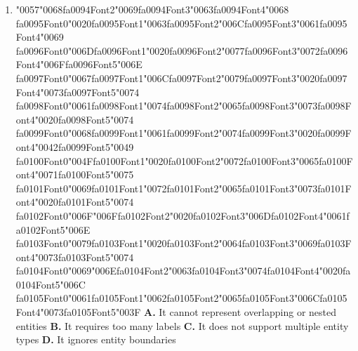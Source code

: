 \documentclass[11pt]{article}
\begin{document}
\begin{enumerate}[leftmargin=*]
  \item {\char"0057}{\char"0068}{\csname fa0094Font2\endcsname\char"0069}{\csname fa0094Font3\endcsname\char"0063}{\csname fa0094Font4\endcsname\char"0068} {\csname fa0095Font0\endcsname\char"0020}{\csname fa0095Font1\endcsname\char"0063}{\csname fa0095Font2\endcsname\char"006C}{\csname fa0095Font3\endcsname\char"0061}{\csname fa0095Font4\endcsname\char"0069} {\csname fa0096Font0\endcsname\char"006D}{\csname fa0096Font1\endcsname\char"0020}{\csname fa0096Font2\endcsname\char"0077}{\csname fa0096Font3\endcsname\char"0072}{\csname fa0096Font4\endcsname\char"006F}{\csname fa0096Font5\endcsname\char"006E} {\csname fa0097Font0\endcsname\char"0067}{\csname fa0097Font1\endcsname\char"006C}{\csname fa0097Font2\endcsname\char"0079}{\csname fa0097Font3\endcsname\char"0020}{\csname fa0097Font4\endcsname\char"0073}{\csname fa0097Font5\endcsname\char"0074} {\csname fa0098Font0\endcsname\char"0061}{\csname fa0098Font1\endcsname\char"0074}{\csname fa0098Font2\endcsname\char"0065}{\csname fa0098Font3\endcsname\char"0073}{\csname fa0098Font4\endcsname\char"0020}{\csname fa0098Font5\endcsname\char"0074} {\csname fa0099Font0\endcsname\char"0068}{\csname fa0099Font1\endcsname\char"0061}{\csname fa0099Font2\endcsname\char"0074}{\csname fa0099Font3\endcsname\char"0020}{\csname fa0099Font4\endcsname\char"0042}{\csname fa0099Font5\endcsname\char"0049} {\csname fa0100Font0\endcsname\char"004F}{\csname fa0100Font1\endcsname\char"0020}{\csname fa0100Font2\endcsname\char"0072}{\csname fa0100Font3\endcsname\char"0065}{\csname fa0100Font4\endcsname\char"0071}{\csname fa0100Font5\endcsname\char"0075} {\csname fa0101Font0\endcsname\char"0069}{\csname fa0101Font1\endcsname\char"0072}{\csname fa0101Font2\endcsname\char"0065}{\csname fa0101Font3\endcsname\char"0073}{\csname fa0101Font4\endcsname\char"0020}{\csname fa0101Font5\endcsname\char"0074} {\csname fa0102Font0\endcsname\char"006F}{\char"006F}{\csname fa0102Font2\endcsname\char"0020}{\csname fa0102Font3\endcsname\char"006D}{\csname fa0102Font4\endcsname\char"0061}{\csname fa0102Font5\endcsname\char"006E} {\csname fa0103Font0\endcsname\char"0079}{\csname fa0103Font1\endcsname\char"0020}{\csname fa0103Font2\endcsname\char"0064}{\csname fa0103Font3\endcsname\char"0069}{\csname fa0103Font4\endcsname\char"0073}{\csname fa0103Font5\endcsname\char"0074} {\csname fa0104Font0\endcsname\char"0069}{\char"006E}{\csname fa0104Font2\endcsname\char"0063}{\csname fa0104Font3\endcsname\char"0074}{\csname fa0104Font4\endcsname\char"0020}{\csname fa0104Font5\endcsname\char"006C} {\csname fa0105Font0\endcsname\char"0061}{\csname fa0105Font1\endcsname\char"0062}{\csname fa0105Font2\endcsname\char"0065}{\csname fa0105Font3\endcsname\char"006C}{\csname fa0105Font4\endcsname\char"0073}{\csname fa0105Font5\endcsname\char"003F}
    \textbf{A.} It cannot represent overlapping or nested entities
    \textbf{B.} It requires too many labels
    \textbf{C.} It does not support multiple entity types
    \textbf{D.} It ignores entity boundaries


\end{enumerate}
\end{document}
